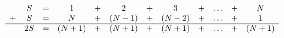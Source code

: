 \documentclass[preview,border=5pt]{standalone}
\begin{document}
\centering

$$\begin{array}{cccccccccccc}& S & = & 1 & + & 2 & + & 3 & + & \ldots & + & N \\ + & S & = & N & + & (N-1) & + & (N-2) & + & \ldots & + & 1\\\hline & 2S & = & (N+1) & + & (N+1) & + & (N+1) & + & \ldots & + & (N+1)\end{array}$$
\end{document}
